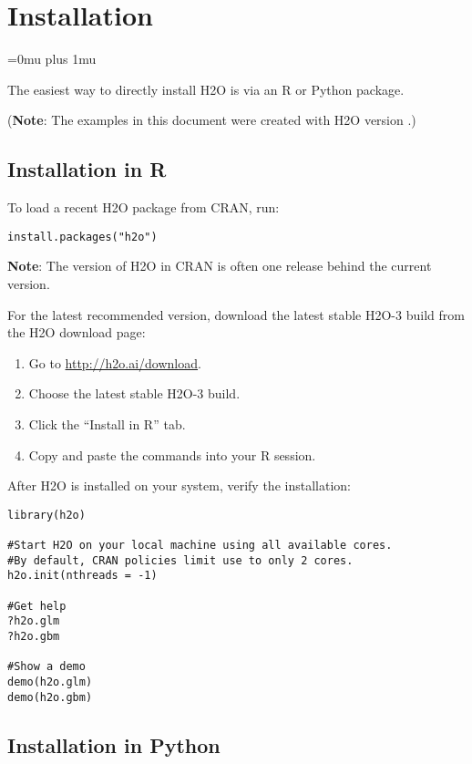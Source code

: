 \section{Installation} 
\Urlmuskip=0mu plus 1mu\relax %


The easiest way to directly install H2O is  via an R or Python package.

({\bf{Note}}: The examples in this document were created with H2O version \waterVersion.)

\subsection{Installation in R}

To load a recent H2O package from CRAN, run:

\begin{lstlisting}[style=R]
install.packages("h2o")
\end{lstlisting}

{\bf{Note}}: The version of H2O in CRAN is often one release behind the current version.

For the latest recommended version, download the
latest stable H2O-3 build from the H2O download page:

\begin{enumerate}
\item Go to {\url{http://h2o.ai/download}}.
\item Choose the latest stable H2O-3 build.
\item Click the ``Install in R'' tab.
\item Copy and paste the commands into your R session.
\end{enumerate}

\bigskip
After H2O is installed on your system, verify the installation:

\begin{lstlisting}[style=R]
library(h2o)

#Start H2O on your local machine using all available cores.
#By default, CRAN policies limit use to only 2 cores.
h2o.init(nthreads = -1)

#Get help
?h2o.glm
?h2o.gbm

#Show a demo
demo(h2o.glm)
demo(h2o.gbm)
\end{lstlisting}

\subsection{Installation in Python}

